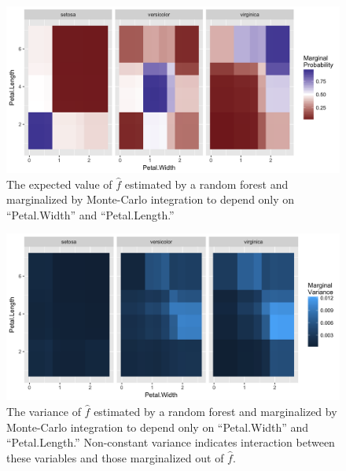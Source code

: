 \begin{figure}
  \includegraphics[width=\textwidth]{mp_int_mean.png}
  \caption{The expected value of $\hat{f}$ estimated by a random forest and marginalized by Monte-Carlo integration to depend only on ``Petal.Width'' and ``Petal.Length.'' \label{figure:mp_int_mean}}
\end{figure}

\begin{figure}
  \includegraphics[width=\textwidth]{mp_int_var.png}
  \caption{The variance of $\hat{f}$ estimated by a random forest and marginalized by Monte-Carlo integration to depend only on ``Petal.Width'' and ``Petal.Length.'' Non-constant variance indicates interaction between these variables and those marginalized out of $\hat{f}$. \label{figure:mp_int_var}}
\end{figure}

\clearpage
\newpage



\address{Zachary M. Jones\\
  Pennsylvania State University\\
  University Park, Pennsylvania\\
  United States\\}
